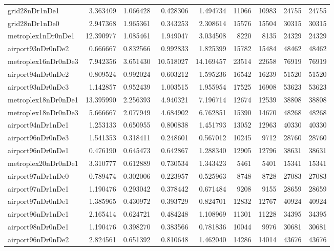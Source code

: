 \begin{longtable}{|l|r|r|r|r|r|r|r|r|}
grid28nDr1nDe1 & 3.363409 & 1.066428 & 0.428306 & 1.494734 & 11066 & 10983 & 24755 & 24755 \\
grid28nDr1nDe0 & 2.947368 & 1.965361 & 0.343253 & 2.308614 & 15576 & 15504 & 30315 & 30315 \\
metroplex1nDr0nDe1 & 12.390977 & 1.085461 & 1.949047 & 3.034508 & 8220 & 8135 & 24329 & 24329 \\
airport93nDr0nDe2 & 0.666667 & 0.832566 & 0.992833 & 1.825399 & 15782 & 15484 & 48462 & 48462 \\
metroplex16nDr0nDe3 & 7.942356 & 3.651430 & 10.518027 & 14.169457 & 23514 & 22658 & 76919 & 76919 \\
airport94nDr0nDe2 & 0.809524 & 0.992024 & 0.603212 & 1.595236 & 16542 & 16239 & 51520 & 51520 \\
airport93nDr0nDe3 & 1.142857 & 0.952439 & 1.003515 & 1.955954 & 17525 & 16908 & 53623 & 53623 \\
metroplex18nDr0nDe1 & 13.395990 & 2.256393 & 4.940321 & 7.196714 & 12674 & 12539 & 38808 & 38808 \\
metroplex18nDr0nDe3 & 5.666667 & 2.077949 & 4.684902 & 6.762851 & 15390 & 14670 & 48268 & 48268 \\
airport94nDr1nDe1 & 1.253133 & 0.650955 & 0.800838 & 1.451793 & 13052 & 12963 & 40330 & 40330 \\
airport96nDr0nDe3 & 1.541353 & 0.318411 & 0.248601 & 0.567012 & 10245 & 9712 & 28760 & 28760 \\
airport96nDr0nDe1 & 0.476190 & 0.645473 & 0.642867 & 1.288340 & 12905 & 12796 & 38631 & 38631 \\
metroplex20nDr0nDe1 & 3.310777 & 0.612889 & 0.730534 & 1.343423 & 5461 & 5401 & 15341 & 15341 \\
airport97nDr1nDe0 & 0.789474 & 0.302006 & 0.223957 & 0.525963 & 8748 & 8728 & 27083 & 27083 \\
airport97nDr1nDe1 & 1.190476 & 0.293042 & 0.378442 & 0.671484 & 9208 & 9155 & 28659 & 28659 \\
airport97nDr0nDe1 & 1.385965 & 0.430972 & 0.393729 & 0.824701 & 12832 & 12767 & 40924 & 40924 \\
airport96nDr1nDe1 & 2.165414 & 0.624721 & 0.484248 & 1.108969 & 11301 & 11228 & 34395 & 34395 \\
airport98nDr0nDe1 & 1.190476 & 0.398270 & 0.383566 & 0.781836 & 10044 & 9976 & 30681 & 30681 \\
airport96nDr0nDe2 & 2.824561 & 0.651392 & 0.810648 & 1.462040 & 14286 & 14014 & 43676 & 43676 \\

\end{longtable}
